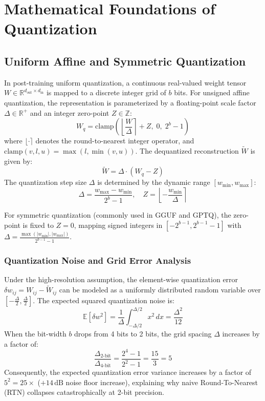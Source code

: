 \documentclass[12pt,a4paper,oneside]{report}
\begin{document}
\chapter{Mathematical Foundations of Quantization}

\section{Uniform Affine and Symmetric Quantization}
In post-training uniform quantization, a continuous real-valued weight tensor $W \in \mathbb{R}^{d_{\text{out}} \times d_{\text{in}}}$ is mapped to a discrete integer grid of $b$ bits. For unsigned affine quantization, the representation is parameterized by a floating-point scale factor $\Delta \in \mathbb{R}^+$ and an integer zero-point $Z \in \mathbb{Z}$:
\begin{equation}
    W_q = \text{clamp}\left( \left\lfloor \frac{W}{\Delta} \right\rceil + Z, \; 0, \; 2^b - 1 \right)
\end{equation}
where $\lfloor \cdot \rceil$ denotes the round-to-nearest integer operator, and $\text{clamp}(v, l, u) = \max(l, \min(v, u))$. The dequantized reconstruction $\widetilde{W}$ is given by:
\begin{equation}
    \widetilde{W} = \Delta \cdot (W_q - Z)
\end{equation}
The quantization step size $\Delta$ is determined by the dynamic range $[w_{\min}, w_{\max}]$:
\begin{equation}
    \Delta = \frac{w_{\max} - w_{\min}}{2^b - 1}, \quad Z = \left\lfloor -\frac{w_{\min}}{\Delta} \right\rceil
\end{equation}

For symmetric quantization (commonly used in GGUF and GPTQ), the zero-point is fixed to $Z = 0$, mapping signed integers in $[-2^{b-1}, 2^{b-1}-1]$ with $\Delta = \frac{\max(|w_{\min}|, |w_{\max}|)}{2^{b-1}-1}$.

\subsection{Quantization Noise and Grid Error Analysis}
Under the high-resolution assumption, the element-wise quantization error $\delta w_{ij} = W_{ij} - \widetilde{W}_{ij}$ can be modeled as a uniformly distributed random variable over $[-\frac{\Delta}{2}, \frac{\Delta}{2}]$. The expected squared quantization noise is:
\begin{equation}
    \mathbb{E}[\delta w^2] = \frac{1}{\Delta} \int_{-\Delta/2}^{\Delta/2} x^2 \, dx = \frac{\Delta^2}{12}
\end{equation}
When the bit-width $b$ drops from 4 bits to 2 bits, the grid spacing $\Delta$ increases by a factor of:
\begin{equation}
    \frac{\Delta_{\text{2-bit}}}{\Delta_{\text{4-bit}}} = \frac{2^4 - 1}{2^2 - 1} = \frac{15}{3} = 5
\end{equation}
Consequently, the expected quantization error variance increases by a factor of $5^2 = 25\times$ ($+14\,\text{dB}$ noise floor increase), explaining why naive Round-To-Nearest (RTN) collapses catastrophically at 2-bit precision.
\end{document}
